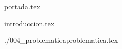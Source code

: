 \documentclass[a4paper, 12pt, twoside]{article}
\begin{document}
{portada.tex}

\tableofcontents

\clearpage


{introduccion.tex}

 {./004_problematica}{problematica.tex}

\clearpage


\end{document}
